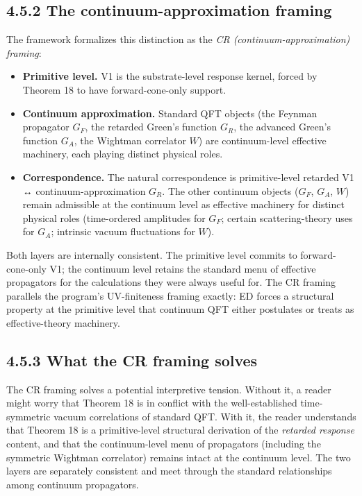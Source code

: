 \documentclass[11pt]{book}
\begin{document}
\subsection{4.5.2 The continuum-approximation framing}

The framework formalizes this distinction as the \textit{CR (continuum-approximation) framing}:

\begin{itemize}
\item \textbf{Primitive level.} V1 is the substrate-level response kernel, forced by Theorem 18 to have forward-cone-only support.
\item \textbf{Continuum approximation.} Standard QFT objects (the Feynman propagator $G_F$, the retarded Green's function $G_R$, the advanced Green's function $G_A$, the Wightman correlator $W$) are continuum-level effective machinery, each playing distinct physical roles.
\item \textbf{Correspondence.} The natural correspondence is primitive-level retarded V1 ↔ continuum-approximation $G_R$. The other continuum objects ($G_F$, $G_A$, $W$) remain admissible at the continuum level as effective machinery for distinct physical roles (time-ordered amplitudes for $G_F$; certain scattering-theory uses for $G_A$; intrinsic vacuum fluctuations for $W$).
\end{itemize}

Both layers are internally consistent. The primitive level commits to forward-cone-only V1; the continuum level retains the standard menu of effective propagators for the calculations they were always useful for. The CR framing parallels the program's UV-finiteness framing exactly: ED forces a structural property at the primitive level that continuum QFT either postulates or treats as effective-theory machinery.

\subsection{4.5.3 What the CR framing solves}

The CR framing solves a potential interpretive tension. Without it, a reader might worry that Theorem 18 is in conflict with the well-established time-symmetric vacuum correlations of standard QFT. With it, the reader understands that Theorem 18 is a primitive-level structural derivation of the \textit{retarded response} content, and that the continuum-level menu of propagators (including the symmetric Wightman correlator) remains intact at the continuum level. The two layers are separately consistent and meet through the standard relationships among continuum propagators.
\end{document}
